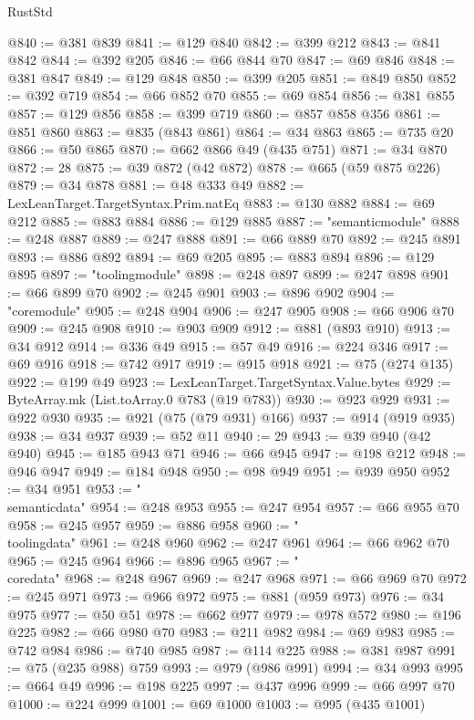 \begin{lexlean}{RustStd}
\begin{coremodule}
@840 := @381 @839
@841 := @129 @840
@842 := @399 @212
@843 := @841 @842
@844 := @392 @205
@846 := @66 @844 @70
@847 := @69 @846
@848 := @381 @847
@849 := @129 @848
@850 := @399 @205
@851 := @849 @850
@852 := @392 @719
@854 := @66 @852 @70
@855 := @69 @854
@856 := @381 @855
@857 := @129 @856
@858 := @399 @719
@860 := @857 @858 @356
@861 := @851 @860
@863 := @835 (@843 @861)
@864 := @34 @863
@865 := @735 @20
@866 := @50 @865
@870 := @662 @866 @49 (@435 @751)
@871 := @34 @870
@872 := 28
@875 := @39 @872 (@42 @872)
@878 := @665 (@59 @875 @226)
@879 := @34 @878
@881 := @48 @333 @49
@882 := LexLeanTarget.TargetSyntax.Prim.natEq
@883 := @130 @882
@884 := @69 @212
@885 := @883 @884
@886 := @129 @885
@887 := "semanticmodule"
@888 := @248 @887
@889 := @247 @888
@891 := @66 @889 @70
@892 := @245 @891
@893 := @886 @892
@894 := @69 @205
@895 := @883 @894
@896 := @129 @895
@897 := "toolingmodule"
@898 := @248 @897
@899 := @247 @898
@901 := @66 @899 @70
@902 := @245 @901
@903 := @896 @902
@904 := "coremodule"
@905 := @248 @904
@906 := @247 @905
@908 := @66 @906 @70
@909 := @245 @908
@910 := @903 @909
@912 := @881 (@893 @910)
@913 := @34 @912
@914 := @336 @49
@915 := @57 @49
@916 := @224 @346
@917 := @69 @916
@918 := @742 @917
@919 := @915 @918
@921 := @75 (@274 @135)
@922 := @199 @49
@923 := LexLeanTarget.TargetSyntax.Value.bytes
@929 := ByteArray.mk (List.toArray.{0} @783 (@19 @783))
@930 := @923 @929
@931 := @922 @930
@935 := @921 (@75 (@79 @931) @166)
@937 := @914 (@919 @935)
@938 := @34 @937
@939 := @52 @11
@940 := 29
@943 := @39 @940 (@42 @940)
@945 := @185 @943 @71
@946 := @66 @945
@947 := @198 @212
@948 := @946 @947
@949 := @184 @948
@950 := @98 @949
@951 := @939 @950
@952 := @34 @951
@953 := "\\semanticdata"
@954 := @248 @953
@955 := @247 @954
@957 := @66 @955 @70
@958 := @245 @957
@959 := @886 @958
@960 := "\\toolingdata"
@961 := @248 @960
@962 := @247 @961
@964 := @66 @962 @70
@965 := @245 @964
@966 := @896 @965
@967 := "\\coredata"
@968 := @248 @967
@969 := @247 @968
@971 := @66 @969 @70
@972 := @245 @971
@973 := @966 @972
@975 := @881 (@959 @973)
@976 := @34 @975
@977 := @50 @51
@978 := @662 @977
@979 := @978 @572
@980 := @196 @225
@982 := @66 @980 @70
@983 := @211 @982
@984 := @69 @983
@985 := @742 @984
@986 := @740 @985
@987 := @114 @225
@988 := @381 @987
@991 := @75 (@235 @988) @759
@993 := @979 (@986 @991)
@994 := @34 @993
@995 := @664 @49
@996 := @198 @225
@997 := @437 @996
@999 := @66 @997 @70
@1000 := @224 @999
@1001 := @69 @1000
@1003 := @995 (@435 @1001)

\end{coremodule}
\end{lexlean}

